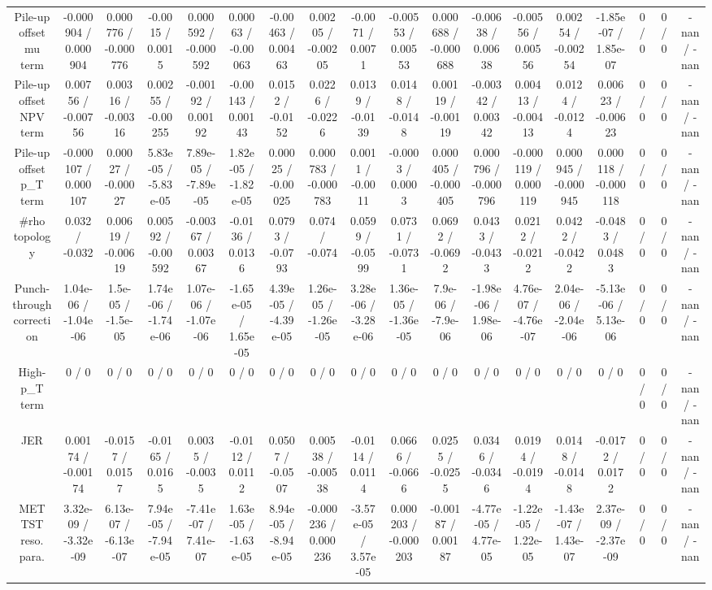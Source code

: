 \documentclass[10pt]{article}
\begin{document}
\begin{table}[htbp]
\begin{center}
\begin{tabular}{|c|c|c|c|c|c|c|c|c|c|c|c|c|c|c|c|c|c|}
  Pile-up offset mu term & -0.000904 / 0.000904 & 0.000776 / -0.000776 & -0.0015 / 0.0015 & 0.000592 / -0.000592 & 0.00063 / -0.00063 & -0.00463 / 0.00463 & 0.00205 / -0.00205 & -0.0071 / 0.0071 & -0.00553 / 0.00553 & 0.000688 / -0.000688 & -0.00638 / 0.00638 & -0.00556 / 0.00556 & 0.00254 / -0.00254 & -1.85e-07 / 1.85e-07 & 0 / 0 & 0 / 0 & -nan / -nan \\ 
  Pile-up offset NPV term & 0.00756 / -0.00756 & 0.00316 / -0.00316 & 0.00255 / -0.00255 & -0.00192 / 0.00192 & -0.00143 / 0.00143 & 0.0152 / -0.0152 & 0.0226 / -0.0226 & 0.0139 / -0.0139 & 0.0148 / -0.0148 & 0.00119 / -0.00119 & -0.00342 / 0.00342 & 0.00413 / -0.00413 & 0.0124 / -0.0124 & 0.00623 / -0.00623 & 0 / 0 & 0 / 0 & -nan / -nan \\ 
  Pile-up offset p_{T} term & -0.000107 / 0.000107 & 0.00027 / -0.00027 & 5.83e-05 / -5.83e-05 & 7.89e-05 / -7.89e-05 & 1.82e-05 / -1.82e-05 & 0.00025 / -0.00025 & 0.000783 / -0.000783 & 0.0011 / -0.0011 & -0.0003 / 0.0003 & 0.000405 / -0.000405 & 0.000796 / -0.000796 & -0.000119 / 0.000119 & 0.000945 / -0.000945 & 0.000118 / -0.000118 & 0 / 0 & 0 / 0 & -nan / -nan \\ 
  #rho topology & 0.032 / -0.032 & 0.00619 / -0.00619 & 0.00592 / -0.00592 & -0.00367 / 0.00367 & -0.0136 / 0.0136 & 0.0793 / -0.0793 & 0.074 / -0.074 & 0.0599 / -0.0599 & 0.0731 / -0.0731 & 0.0692 / -0.0692 & 0.0433 / -0.0433 & 0.0212 / -0.0212 & 0.0422 / -0.0422 & -0.0483 / 0.0483 & 0 / 0 & 0 / 0 & -nan / -nan \\ 
  Punch-through correction & 1.04e-06 / -1.04e-06 & 1.5e-05 / -1.5e-05 & 1.74e-06 / -1.74e-06 & 1.07e-06 / -1.07e-06 & -1.65e-05 / 1.65e-05 & 4.39e-05 / -4.39e-05 & 1.26e-05 / -1.26e-05 & 3.28e-06 / -3.28e-06 & 1.36e-05 / -1.36e-05 & 7.9e-06 / -7.9e-06 & -1.98e-06 / 1.98e-06 & 4.76e-07 / -4.76e-07 & 2.04e-06 / -2.04e-06 & -5.13e-06 / 5.13e-06 & 0 / 0 & 0 / 0 & -nan / -nan \\ 
  High-p_{T} term & 0 / 0 & 0 / 0 & 0 / 0 & 0 / 0 & 0 / 0 & 0 / 0 & 0 / 0 & 0 / 0 & 0 / 0 & 0 / 0 & 0 / 0 & 0 / 0 & 0 / 0 & 0 / 0 & 0 / 0 & 0 / 0 & -nan / -nan \\ 
  JER & 0.00174 / -0.00174 & -0.0157 / 0.0157 & -0.0165 / 0.0165 & 0.0035 / -0.0035 & -0.0112 / 0.0112 & 0.0507 / -0.0507 & 0.00538 / -0.00538 & -0.0114 / 0.0114 & 0.0666 / -0.0666 & 0.0255 / -0.0255 & 0.0346 / -0.0346 & 0.0194 / -0.0194 & 0.0148 / -0.0148 & -0.0172 / 0.0172 & 0 / 0 & 0 / 0 & -nan / -nan \\ 
  MET TST reso. para. & 3.32e-09 / -3.32e-09 & 6.13e-07 / -6.13e-07 & 7.94e-05 / -7.94e-05 & -7.41e-07 / 7.41e-07 & 1.63e-05 / -1.63e-05 & 8.94e-05 / -8.94e-05 & -0.000236 / 0.000236 & -3.57e-05 / 3.57e-05 & 0.000203 / -0.000203 & -0.00187 / 0.00187 & -4.77e-05 / 4.77e-05 & -1.22e-05 / 1.22e-05 & -1.43e-07 / 1.43e-07 & 2.37e-09 / -2.37e-09 & 0 / 0 & 0 / 0 & -nan / -nan \\ 

\end{tabular}
\end{center}
\end{table}
\end{document}
